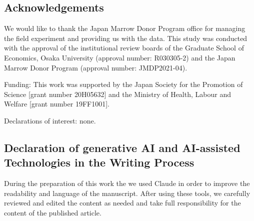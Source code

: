 \documentclass[12pt, a4paper]{article}
\begin{document}
\begin{spacing}{1}
  \section*{Acknowledgements}
  We would like to thank the Japan Marrow Donor Program office for managing the field experiment and providing us with the data. This study was conducted with the approval of the institutional review boards of the Graduate School of Economics, Osaka University (approval number: R030305-2) and the Japan Marrow Donor Program (approval number: JMDP2021-04).

  \vspace{0.5em}

  \noindent
  Funding: This work was supported by the Japan Society for the Promotion of Science {[}grant number 20H05632{]} and the Ministry of Health, Labour and Welfare {[}grant number 19FF1001{]}.

  \vspace{0.5em}

  \noindent
  Declarations of interest: none.
\end{spacing}
\begin{spacing}{1}
  \section*{Declaration of generative AI and AI-assisted Technologies in the Writing Process}
  During the preparation of this work the we used Claude in order to improve the readability and language of the manuscript. After using these tools, we carefully reviewed and edited the content as needed and take full responsibility for the content of the published article.
\end{spacing}
\begin{spacing}{1}
  
\end{spacing}
\end{document}
